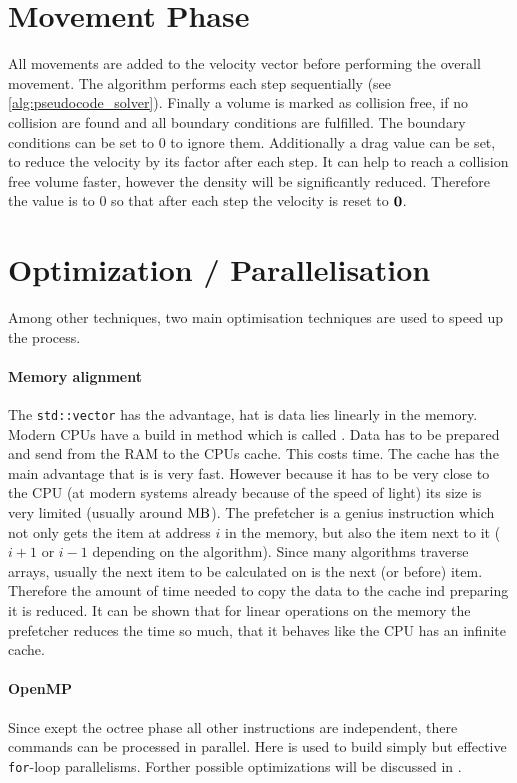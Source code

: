 \section{Movement Phase}
All movements are added to the velocity vector before performing the overall movement.
The algorithm performs each step sequentially (see \cref{alg:pseudocode_solver}).
% 
Finally a volume is marked as collision free, if no collision are found and all boundary conditions are fulfilled. 
The boundary conditions can be set to 0 to ignore them.
Additionally a drag value can be set, to reduce the velocity by its factor after each step.
It can help to reach a collision free volume faster, however the density will be significantly reduced.
Therefore the value is to 0 so that after each step the velocity is reset to $\mathbf{0}$. 
% 
\section{Optimization / Parallelisation}
% 
Among other techniques, two main optimisation techniques are used to speed up the process.
% 
\paragraph{Memory alignment}
The \texttt{std::vector} has the advantage, hat is data lies linearly in the memory.
Modern \ac{CPU}s have a build in method which is called .
Data has to be prepared and send from the \ac{RAM} to the \ac{CPU}s cache.
This costs time.
The cache has the main advantage that is is very fast.
However because it has to be very close to the \ac{CPU} (at modern systems already because of the speed of light) its size is very limited (usually around $\si{\mega\byte}$).
The prefetcher is a genius instruction which not only gets the item at address $i$ in the memory, but also the item next to it ($i+1$ or $i-1$ depending on the algorithm).
Since many algorithms traverse arrays, usually the next item to be calculated on is the next (or before) item.
Therefore the amount of time needed to copy the data to the cache ind preparing it is reduced.
It can be shown that for linear operations on the memory the prefetcher reduces the time so much, that it behaves like the \ac{CPU} has an infinite cache.
% 
\paragraph{OpenMP}
% 
Since exept the octree phase all other instructions are independent, there commands can be processed in parallel. Here \openmp is used to build simply but effective \texttt{for}-loop parallelisms.
% 
Forther possible optimizations will be discussed in \dummy{}.
% 
% 
% 
